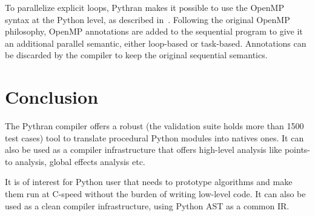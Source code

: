 \documentclass{llncs}
\begin{document}
To parallelize explicit loops, Pythran makes it possible to use the OpenMP
syntax at the Python level, as described in~\cite{pythranOMP2013}. Following
the original OpenMP philosophy, OpenMP annotations are added to the sequential
program to give it an additional parallel semantic, either loop-based or
task-based. Annotations can be discarded by the compiler to keep the original
sequential semantics.

\section{Conclusion}

The Pythran compiler offers a robust (the validation suite holds more than 1500
test cases) tool to translate procedural Python modules into natives ones. It
can also be used as a compiler infrastructure that offers high-level analysis
like points-to analysis, global effects analysis etc.

It is of interest for Python user that needs to prototype algorithms and make
them run at C-speed without the burden of writing low-level code. It can also
be used as a clean compiler infrastructure, using Python \ac{AST} as a
common \ac{IR}.


\end{document}
